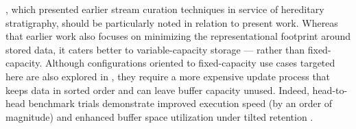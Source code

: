 \citet{moreno2024algorithms}, which presented earlier stream curation techniques in service of hereditary stratigraphy, should be particularly noted in relation to present work.
Whereas that earlier work also focuses on minimizing the representational footprint around stored data, it caters better to variable-capacity storage --- rather than fixed-capacity.
Although configurations oriented to fixed-capacity use cases targeted here are also explored in \citet{moreno2024algorithms}, they require a more expensive update process that keeps data in sorted order and can leave buffer capacity unused.
Indeed, head-to-head benchmark trials demonstrate improved execution speed (by an order of magnitude) and enhanced buffer space utilization under tilted retention \citep{moreno2024guide,moreno2024trackable}.
